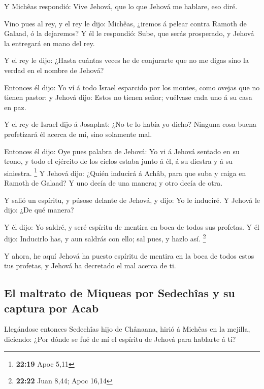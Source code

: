  Y Michêas respondió: Vive Jehová, que lo que Jehová me
hablare, eso diré.

 Vino pues al rey, y el rey le dijo: Michêas, ¿iremos á
pelear contra Ramoth de Galaad, ó la dejaremos? Y él le respondió: Sube,
que serás prosperado, y Jehová la entregará en mano del rey.

 Y el rey le dijo: ¿Hasta cuántas veces he de conjurarte
que no me digas sino la verdad en el nombre de Jehová?

 Entonces él dijo: Yo ví á todo Israel esparcido por los
montes, como ovejas que no tienen pastor: y Jehová dijo: Estos no tienen
señor; vuélvase cada uno á su casa en paz.

 Y el rey de Israel dijo á Josaphat: ¿No te lo había yo
dicho? Ninguna cosa buena profetizará él acerca de mí, sino solamente
mal.

 Entonces él dijo: Oye pues palabra de Jehová: Yo vi á
Jehová sentado en su trono, y todo el ejército de los cielos estaba
junto á él, á su diestra y á su siniestra. \footnote{\textbf{22:19} Apoc
  5,11}  Y Jehová dijo: ¿Quién inducirá á Achâb, para que
suba y caiga en Ramoth de Galaad? Y uno decía de una manera; y otro
decía de otra.

 Y salió un espíritu, y púsose delante de Jehová, y dijo:
Yo le induciré. Y Jehová le dijo: ¿De qué manera?

 Y él dijo: Yo saldré, y seré espíritu de mentira en boca
de todos sus profetas. Y él dijo: Inducirlo has, y aun saldrás con ello;
sal pues, y hazlo así. \footnote{\textbf{22:22} Juan 8,44; Apoc 16,14}

 Y ahora, he aquí Jehová ha puesto espíritu de mentira en
la boca de todos estos tus profetas, y Jehová ha decretado el mal acerca
de ti.

\hypertarget{el-maltrato-de-miqueas-por-sedechuxeeas-y-su-captura-por-acab}{%
\subsection{El maltrato de Miqueas por Sedechîas y su captura por
Acab}\label{el-maltrato-de-miqueas-por-sedechuxeeas-y-su-captura-por-acab}}

 Llegándose entonces Sedechîas hijo de Chânaana, hirió á
Michêas en la mejilla, diciendo: ¿Por dónde se fué de mí el espíritu de
Jehová para hablarte á ti?

